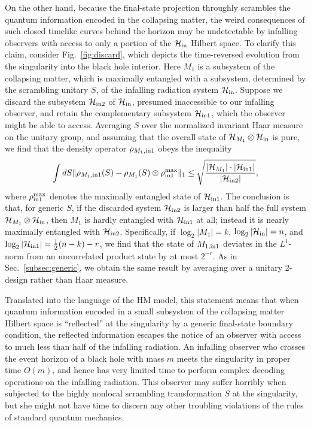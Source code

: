 \documentclass[11pt]{article}
\begin{document}
On the other hand, because the final-state projection throughly scrambles the quantum information encoded in the collapsing matter, the weird consequences of such closed timelike curves behind the horizon may be undetectable by infalling observers with access to only a portion of the $\mathcal{H}_{\rm in}$ Hilbert space. To clarify this claim, consider Fig.~\ref{fig:discard}, which depicts the time-reversed evolution from the singularity into the black hole interior. Here $M_1$ is a subsystem of the collapsing matter, which is maximally entangled with a subsystem, determined by the scrambling unitary $S$, of the infalling radiation system $\mathcal{H}_{\rm in}$. Suppose we discard the subsystem $\mathcal{H}_{{\rm in}2}$ of $\mathcal{H}_{\rm in}$, presumed inaccessible to our infalling observer, and retain the complementary subsystem $\mathcal{H}_{{\rm in}1}$, which the observer might be able to access. Averaging $S$ over the normalized invariant Haar measure on the unitary group, and assuming that the overall state of $\mathcal{H}_{M_1}\otimes \mathcal{H}_{\rm in}$ is pure, we find that the density operator $\rho_{M_1,{\rm in1}}$ obeys the inequality \cite{decoupling}
\begin{eqnarray}
\int dS \|\rho_{M_1,{\rm in1}}(S)-\rho_{M_1}(S)\otimes \rho_{\rm in1}^{\rm max}  \|_1 \le \sqrt{\frac{|\mathcal{H}_{M_1}|\cdot |\mathcal{H}_{\rm in1}|}{|\mathcal{H}_{\rm in2}|}},
\end{eqnarray}
where $\rho_{\rm in1}^{\rm max}$ denotes the maximally entangled state of $\mathcal{H}_{{\rm in}1}$. The conclusion is that, for generic $S$, if the discarded system $\mathcal{H}_{{\rm in}2}$ is larger than half the full system $\mathcal{H}_{M_1}\otimes \mathcal{H}_{\rm in}$, then $M_1$ is hardly entangled with $\mathcal{H}_{{\rm in}1}$ at all; instead it is nearly maximally entangled with $\mathcal{H}_{{\rm in}2}$. Specifically, if $\log_2|M_1| = k$, $\log_2|\mathcal{H}_{\rm in}| = n$, and $\log_2 |\mathcal{H}_{{\rm in}1}|= \frac{1}{2}(n-k)-r$, we find that the state of $M_{1,{\rm in 1}}$ deviates in the $L^1$-norm from an uncorrelated product state by at most $2^{-r}$. As in Sec.~\ref{subsec:generic}, we obtain the same result by averaging over a unitary 2-design rather than Haar measure.

Translated into the language of the HM model, this statement means that when quantum information encoded in a small subsystem of the collapsing matter Hilbert space is ``reflected'' at the singularity by a generic final-state boundary condition, the reflected information escapes the notice of an observer with access to much less than half of the infalling radiation. An infalling observer who crosses the event horizon of a black hole with mass $m$ meets the singularity in proper time $O(m)$, and hence has very limited time to perform complex decoding operations on the infalling radiation. This observer may suffer horribly when subjected to the highly nonlocal scrambling transformation $S$ at the singularity, but she might not have time to discern any other troubling violations of the rules of standard quantum mechanics.
\end{document}

